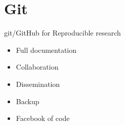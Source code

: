 \documentclass{beamer}
\begin{document}
\section{Git}
\begin{frame}{git/GitHub for Reproducible research}
\begin{itemize}
	\item<2->{Full documentation}
	\vspace{2ex}
	\item<3->{Collaboration}
	\vspace{2ex}
	\item<4->{Dissemination}
	\vspace{2ex}
	\item<5->{Backup}
	\vspace{2ex}
	\item<6->{Facebook of code}
\end{itemize}
\end{frame}
\end{document}
